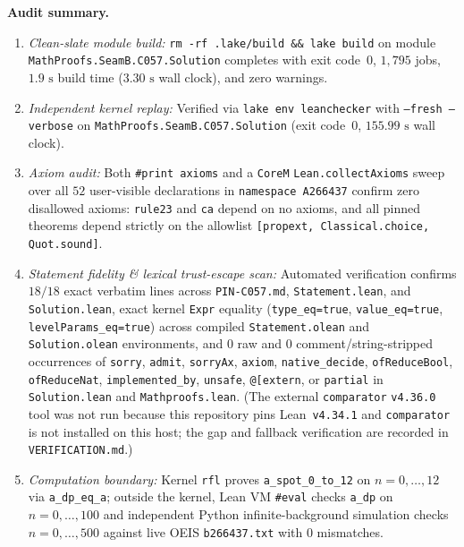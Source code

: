 \documentclass[11pt]{article}
\theoremstyle{definition}
\begin{document}
\noindent\textbf{Audit summary.}
\begin{enumerate}
\item \emph{Clean-slate module build:} \texttt{rm -rf .lake/build \&\& lake build} on module \nolinkurl{MathProofs.SeamB.C057.Solution} completes with exit code~$0$, $1{,}795$ jobs, $1.9\text{ s}$ build time ($3.30\text{ s}$ wall clock), and zero warnings.
\item \emph{Independent kernel replay:} Verified via \texttt{lake env leanchecker} with \texttt{--fresh --verbose} on \nolinkurl{MathProofs.SeamB.C057.Solution} (exit code~$0$, $155.99\text{ s}$ wall clock).
\item \emph{Axiom audit:} Both \texttt{\#print axioms} and a \texttt{CoreM} \texttt{Lean.collectAxioms} sweep over all $52$ user-visible declarations in \texttt{namespace A266437} confirm zero disallowed axioms: \texttt{rule23} and \texttt{ca} depend on no axioms, and all pinned theorems depend strictly on the allowlist \texttt{[propext, Classical.choice, Quot.sound]}.
\item \emph{Statement fidelity \& lexical trust-escape scan:} Automated verification confirms $18/18$ exact verbatim lines across \texttt{PIN-C057.md}, \texttt{Statement.lean}, and \texttt{Solution.lean}, exact kernel \texttt{Expr} equality (\texttt{type\_eq=true}, \texttt{value\_eq=true}, \texttt{levelParams\_eq=true}) across compiled \texttt{Statement.olean} and \texttt{Solution.olean} environments, and $0$ raw and $0$ comment/string-stripped occurrences of \texttt{sorry}, \texttt{admit}, \texttt{sorryAx}, \texttt{axiom}, \texttt{native\_decide}, \texttt{ofReduceBool}, \texttt{ofReduceNat}, \texttt{implemented\_by}, \texttt{unsafe}, \texttt{@[extern}, or \texttt{partial} in \texttt{Solution.lean} and \texttt{Mathproofs.lean}. (The external \texttt{comparator} \texttt{v4.36.0} tool was not run because this repository pins Lean~\texttt{v4.34.1} and \texttt{comparator} is not installed on this host; the gap and fallback verification are recorded in \texttt{VERIFICATION.md}.)
\item \emph{Computation boundary:} Kernel \texttt{rfl} proves \texttt{a\_spot\_0\_to\_12} on $n = 0, \dots, 12$ via \texttt{a\_dp\_eq\_a}; outside the kernel, Lean VM \texttt{\#eval} checks \texttt{a\_dp} on $n = 0, \dots, 100$ and independent Python infinite-background simulation checks $n = 0, \dots, 500$ against live OEIS \texttt{b266437.txt} with $0$ mismatches.
\end{enumerate}
\end{document}
